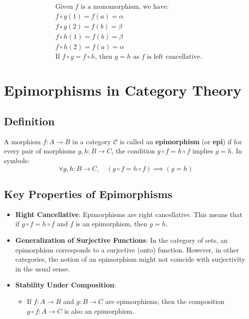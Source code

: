 \documentclass{article}
\begin{document}
\begin{align*}
&\text{Given } f \text{ is a monomorphism, we have:} \\
&f \circ g(1) = f(a) = \alpha \\
&f \circ g(2) = f(b) = \beta \\
&f \circ h(1) = f(b) = \beta \\
&f \circ h(2) = f(a) = \alpha \\
&\text{If } f \circ g = f \circ h \text{, then } g = h \text{ as } f \text{ is left cancellative}.
\end{align*}




\section*{Epimorphisms in Category Theory}

\subsection*{Definition}
A morphism $f : A \rightarrow B$ in a category $\mathcal{C}$ is called an \textbf{epimorphism} (or \textbf{epi}) if for every pair of morphisms $g, h : B \rightarrow C$, the condition $g \circ f = h \circ f$ implies $g = h$.
\newline
In symbols:
\begin{equation*}
\forall g, h : B \rightarrow C, \quad (g \circ f = h \circ f) \implies (g = h)
\end{equation*}

\subsection*{Key Properties of Epimorphisms}
\begin{itemize}
    \item \textbf{Right Cancellative}: Epimorphisms are right cancellative. This means that if $g \circ f = h \circ f$ and $f$ is an epimorphism, then $g = h$.
    \item \textbf{Generalization of Surjective Functions}: In the category of sets, an epimorphism corresponds to a surjective (onto) function. However, in other categories, the notion of an epimorphism might not coincide with surjectivity in the usual sense.
    \item \textbf{Stability Under Composition}:
    \begin{itemize}
        \item If $f : A \rightarrow B$ and $g : B \rightarrow C$ are epimorphisms, then the composition $g \circ f : A \rightarrow C$ is also an epimorphism.
    \end{itemize}
\end{itemize}
\end{document}
